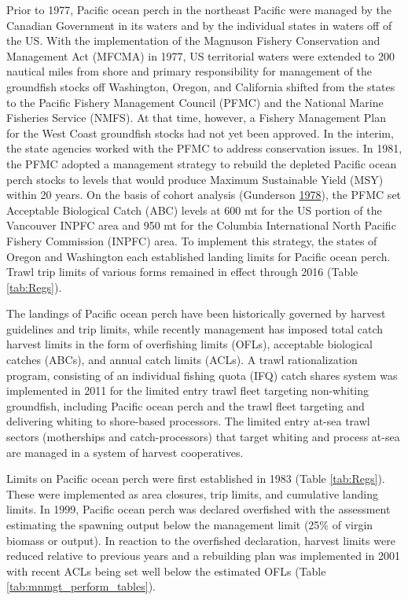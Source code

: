 \documentclass[12pt,]{article}
\begin{document}
Prior to 1977, Pacific ocean perch in the northeast Pacific were managed
by the Canadian Government in its waters and by the individual states in
waters off of the US. With the implementation of the Magnuson Fishery
Conservation and Management Act (MFCMA) in 1977, US territorial waters
were extended to 200 nautical miles from shore and primary
responsibility for management of the groundfish stocks off Washington,
Oregon, and California shifted from the states to the Pacific Fishery
Management Council (PFMC) and the National Marine Fisheries Service
(NMFS). At that time, however, a Fishery Management Plan for the West
Coast groundfish stocks had not yet been approved. In the interim, the
state agencies worked with the PFMC to address conservation issues. In
1981, the PFMC adopted a management strategy to rebuild the depleted
Pacific ocean perch stocks to levels that would produce Maximum
Sustainable Yield (MSY) within 20 years. On the basis of cohort analysis
(Gunderson \protect\hyperlink{ref-gunderson_results_1978}{1978}), the
PFMC set Acceptable Biological Catch (ABC) levels at 600 mt for the US
portion of the Vancouver INPFC area and 950 mt for the Columbia
International North Pacific Fishery Commission (INPFC) area. To
implement this strategy, the states of Oregon and Washington each
established landing limits for Pacific ocean perch. Trawl trip limits of
various forms remained in effect through 2016 (Table \ref{tab:Regs}).

The landings of Pacific ocean perch have been historically governed by
harvest guidelines and trip limits, while recently management has
imposed total catch harvest limits in the form of overfishing limits
(OFLs), acceptable biological catches (ABCs), and annual catch limits
(ACLs). A trawl rationalization program, consisting of an individual
fishing quota (IFQ) catch shares system was implemented in 2011 for the
limited entry trawl fleet targeting non-whiting groundfish, including
Pacific ocean perch and the trawl fleet targeting and delivering whiting
to shore-based processors. The limited entry at-sea trawl sectors
(motherships and catch-processors) that target whiting and process
at-sea are managed in a system of harvest cooperatives.

Limits on Pacific ocean perch were first established in 1983 (Table
\ref{tab:Regs}). These were implemented as area closures, trip limits,
and cumulative landing limits. In 1999, Pacific ocean perch was declared
overfished with the assessment estimating the spawning output below the
management limit (25\% of virgin biomass or output). In reaction to the
overfished declaration, harvest limits were reduced relative to previous
years and a rebuilding plan was implemented in 2001 with recent ACLs
being set well below the estimated OFLs (Table
\ref{tab:mnmgt_perform_tables}).
\end{document}
